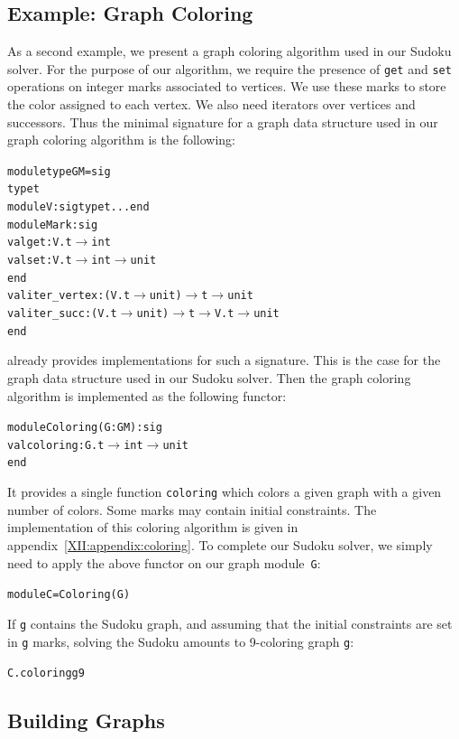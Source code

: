 \subsection{Example: Graph Coloring}
\label{XII:coloring}

As a second example, we present a graph coloring algorithm used in our
Sudoku solver.
For the purpose of our
algorithm, we require the presence of \texttt{get} and \texttt{set}
operations on integer marks associated to vertices. We use these marks
to store the color assigned to each vertex. We also need iterators
over vertices and successors. Thus the minimal signature for a graph
data structure used in our graph coloring algorithm is the following:
\begin{alltt}
module type GM = sig
  type t
  module V : sig type t ... end
  module Mark : sig
    val get : V.t \ensuremath{\rightarrow} int
    val set : V.t \ensuremath{\rightarrow} int \ensuremath{\rightarrow} unit
  end
  val iter_vertex : (V.t \ensuremath{\rightarrow} unit) \ensuremath{\rightarrow} t \ensuremath{\rightarrow} unit
  val iter_succ : (V.t \ensuremath{\rightarrow} unit) \ensuremath{\rightarrow} t \ensuremath{\rightarrow} V.t \ensuremath{\rightarrow} unit
end
\end{alltt}
\ocamlgraph already provides implementations for such a
signature. This is the case for the graph data structure used in our
Sudoku solver.
Then the graph coloring algorithm is implemented as the following functor:
\begin{alltt}
module Coloring(G : GM) : sig
  val coloring : G.t \ensuremath{\rightarrow} int \ensuremath{\rightarrow} unit
end
\end{alltt}
It provides a single function \texttt{coloring} which colors a given
graph with a given number of colors. Some marks may contain initial
constraints. 
The implementation of this coloring algorithm is given in
appendix~\ref{XII:appendix:coloring}. 
To complete our Sudoku solver, we simply need to apply the above
functor on our graph module~\texttt{G}:
\begin{alltt}
module C = Coloring(G)
\end{alltt}
If \texttt{g} contains the Sudoku graph, and
assuming that the initial constraints are set in \texttt{g} marks, 
solving the Sudoku amounts to 9-coloring graph \texttt{g}:
\begin{alltt}
C.coloring g 9
\end{alltt}


\subsection{Building Graphs}\label{XII:builder}

